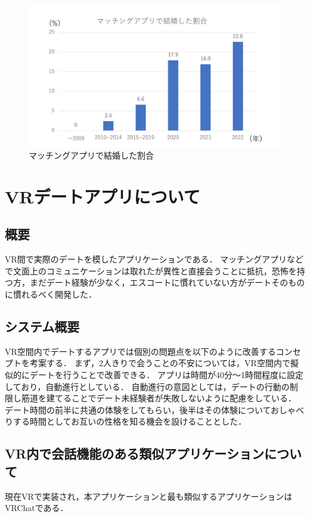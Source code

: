 \documentclass[12pt,a4j,titlepage]{ltjsarticle}
\begin{document}
\begin{figure}[h]
\begin{center}
\includegraphics[keepaspectratio, scale=0.5]{mattinnguwariai.pdf}
\end{center}
 \caption{マッチングアプリで結婚した割合}
 \label{fig:mattingu}
\end{figure}
\clearpage

\section{VRデートアプリについて}
\subsection{概要}
VR間で実際のデートを模したアプリケーションである．
マッチングアプリなどで文面上のコミュニケーションは取れたが異性と直接会うことに抵抗，恐怖を持つ方，まだデート経験が少なく，エスコートに慣れていない方がデートそのものに慣れるべく開発した．

\subsection{システム概要}\label{システム概要}
VR空間内でデートするアプリでは個別の問題点を以下のように改善するコンセプトを考案する．
まず，2人きりで会うことの不安については，VR空間内で擬似的にデートを行うことで改善できる．
アプリは時間が40分〜1時間程度に設定しており，自動進行としている．
自動進行の意図としては，デートの行動の制限し筋道を建てることでデート未経験者が失敗しないように配慮をしている．
デート時間の前半に共通の体験をしてもらい，後半はその体験についておしゃべりする時間としてお互いの性格を知る機会を設けることとした．

\subsection{VR内で会話機能のある類似アプリケーションについて} 
現在VRで実装され，本アプリケーションと最も類似するアプリケーションはVRChatである．
\end{document}
